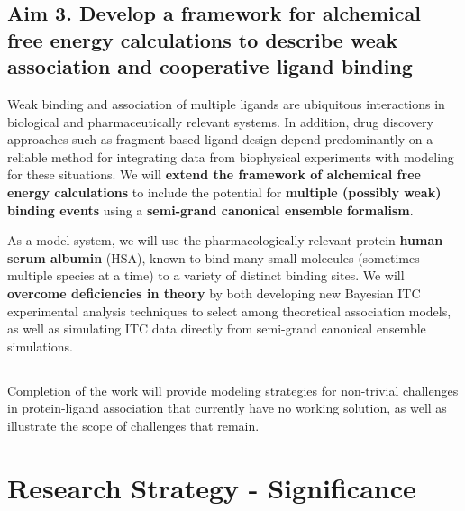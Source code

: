 \documentclass[10pt,final]{article}
\newif\ifinstr
\newcommand{\instr}[1]{\ifdraft{\ifinstr {\color{cyan}\emph{#1}} \fi}{}}
\begin{document}
\subsection*{Aim 3. Develop a framework for alchemical free energy calculations to describe weak association and cooperative ligand binding}
Weak binding and association of multiple ligands are ubiquitous interactions in biological and pharmaceutically relevant systems.
In addition, drug discovery approaches such as fragment-based ligand design depend predominantly on a reliable method for integrating data from biophysical experiments with modeling for these situations.
We will \textbf{ extend the framework of alchemical free energy calculations}  to include the potential for \textbf{ multiple (possibly weak) binding events } using a \textbf{ semi-grand canonical ensemble formalism}.

As a model system, we will use the pharmacologically relevant protein \textbf{ human serum albumin } (HSA), known to bind many small molecules (sometimes multiple species at a time) to a variety of distinct binding sites.
We will  \textbf{ overcome deficiencies in theory } by both developing new Bayesian ITC experimental analysis techniques to select among theoretical association models, as well as simulating ITC data directly from semi-grand canonical ensemble simulations.

\subsection*{} %

Completion of the work will provide modeling strategies for non-trivial challenges in protein-ligand association that currently have no working solution, as well as illustrate the scope of challenges that remain.

\section*{Research Strategy - Significance}
\instr{General background, significance in terms of basic science and disease relevance.}


\end{document}
